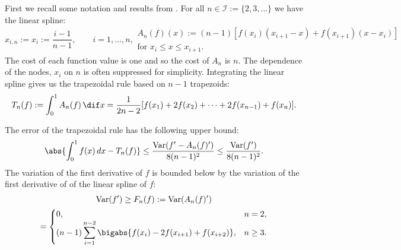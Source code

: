 \documentclass[]{elsarticle}
\DeclareMathOperator{\Var}{Var}
\theoremstyle{definition}
\theoremstyle{remark}
\begin{document}
First we recall some notation and results from \cite{HicEtal14b}.  For all $n \in \mathcal{I}:=\{2,3,\ldots\}$ we have the linear spline:
\begin{subequations} \label{linearspline}
\begin{equation}
x_{i,n}:=x_{i}:=\frac{i-1}{n-1}, \qquad i=1, \ldots, n,
\end{equation}
\begin{multline}
A_{n}(f)(x):=(n-1) \left[ f(x_{i})(x_{i+1}-x) +f(x_{i+1})(x-x_{i}) \right] \\ \text{for }x_{i} \leq x \leq x_{i+1}.
\end{multline}
\end{subequations}
The cost of each function value is one and so the cost of  $A_n$ is $n$. The dependence of the nodes, $x_i$ on $n$ is often suppressed for simplicity.  Integrating the linear spline gives us the trapezoidal rule based on $n-1$ trapezoids:
\begin{equation*}
    T_{n}(f) := \int_0^1 A_n(f) \, \dif x
    =\frac{1}{2n-2}[f(x_{1})+2f(x_{2})+\cdots+2f(x_{n-1})+f(x_{n})].
\end{equation*}

The error of the trapezoidal rule has the following upper bound:
\begin{equation} \label{errbd}
\abs{\int_0^1 f(x) \, dx - T_n(f)} \le \frac{\Var(f'-A_n(f)')}{8(n-1)^2} \le \frac{\Var(f')}{8(n-1)^2}.
\end{equation}
The variation of the first derivative of $f$ is bounded below by the variation of the first derivative of of the linear spline of $f$:
\begin{multline} 
\Var(f') \ge F_n(f) :=\Var(A_n(f)') \\
 = \begin{cases} 0, & n=2, \\
\displaystyle (n-1)\sum_{i=1}^{n-2} \bigabs{f(x_{i}) - 2 f(x_{i+1})+f(x_{i+2})}, 
& n\ge 3. 
\end{cases}
\label{Fnormalg}
\end{multline}
\end{document}
